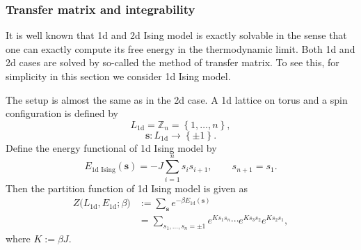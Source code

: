 \subsubsection{Transfer matrix and integrability}

It is well known that 1d and 2d Ising model is exactly solvable in
the sense that one can exactly compute its free energy in the thermodynamic
limit. Both 1d and 2d cases are solved by so-called the method of
transfer matrix. To see this, for simplicity in this section we consider
1d Ising model.

The setup is almost the same as in the 2d case. A 1d lattice on torus
and a spin configuration is defined by
\begin{equation}
L_{\text{1d}}  =  \mathbb{Z}_{n}  =  \left\{ 1,\ldots,n\right\} ,
\end{equation}
%
\begin{equation}
\mathbf{s}  :  L_{\text{1d}}  \longrightarrow  \left\{ \pm1\right\} .
\end{equation}
Define the energy functional of 1d Ising model by
\begin{equation}
  E_{\text{1d Ising}}(\mathbf{s})  =  -J\sum_{i=1}^{n}s_{i}s_{i+1}, \qquad s_{n+1}=s_{1}.
\end{equation}
Then the partition function of 1d Ising model is given as
\begin{align}
  Z\big(L_{\text{1d}},E_{\text{1d}};\beta\big)
  & :=  \sum_{\mathbf{s}}  e^{-\beta E_{\text{1d}}(\mathbf{s})}\nonumber \\
  & =   \sum_{s_{1},\ldots,s_{n}=\pm1}  e^{Ks_{1}s_{n}}  \cdots  e^{Ks_{3}s_{2}}e^{Ks_{2}s_{1}},
\end{align}
where $K:=\beta J$.


